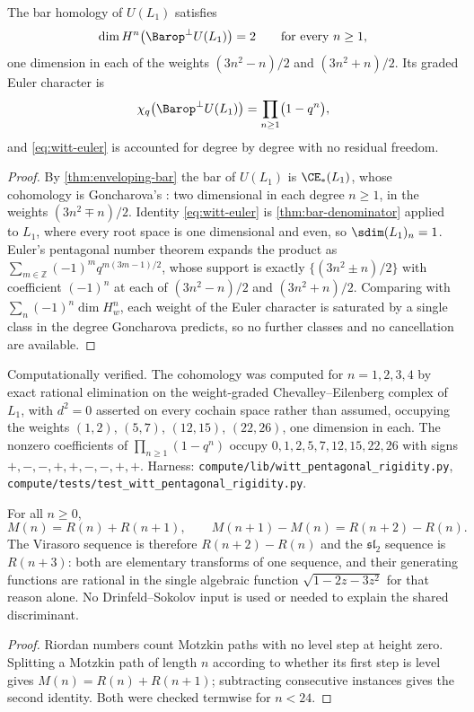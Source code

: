 \begin{theorem}\label{thm:pentagonal}
The bar homology of \(U(L_1)\) satisfies
\[
 \dim H^n\bigl(\Barop^{\perp}U(L_1)\bigr)=2
 \qquad\text{for every }n\ge1,
\]
one dimension in each of the weights \((3n^2-n)/2\) and \((3n^2+n)/2\).  Its
graded Euler character is
\begin{equation}\label{eq:witt-euler}
 \chi_q\bigl(\Barop^{\perp}U(L_1)\bigr)=\prod_{n\ge1}\bigl(1-q^n\bigr),
\end{equation}
and \eqref{eq:witt-euler} is accounted for degree by degree with no residual
freedom.
\end{theorem}
\begin{proof}
By \cref{thm:enveloping-bar} the bar of \(U(L_1)\) is \(\CE_*(L_1)\), whose
cohomology is Goncharova's \cite{Goncharova1973}: two dimensional in each degree
\(n\ge1\), in the weights \((3n^2\mp n)/2\).  Identity \eqref{eq:witt-euler} is
\cref{thm:bar-denominator} applied to \(L_1\), where every root space is one
dimensional and even, so \(\sdim(L_1)_n=1\).  Euler's pentagonal number theorem
expands the product as \(\sum_{m\in\mathbb Z}(-1)^mq^{m(3m-1)/2}\), whose support
is exactly \(\{(3n^2\pm n)/2\}\) with coefficient \((-1)^n\) at each of
\((3n^2-n)/2\) and \((3n^2+n)/2\).  Comparing with \(\sum_n(-1)^n\dim H^n_w\),
each weight of the Euler character is saturated by a single class in the degree
Goncharova predicts, so no further classes and no cancellation are available.
\end{proof}

\begin{statusbox}
Computationally verified.  The cohomology was computed for \(n=1,2,3,4\) by exact
rational elimination on the weight-graded Chevalley--Eilenberg complex of
\(L_1\), with \(d^2=0\) asserted on every cochain space rather than assumed,
occupying the weights \((1,2)\), \((5,7)\), \((12,15)\), \((22,26)\), one
dimension in each.  The nonzero coefficients of \(\prod_{n\ge1}(1-q^n)\) occupy
\(0,1,2,5,7,12,15,22,26\) with signs \(+,-,-,+,+,-,-,+,+\).  Harness:
\texttt{compute/lib/witt\_pentagonal\_rigidity.py},
\texttt{compute/tests/test\_witt\_pentagonal\_rigidity.py}.
\end{statusbox}

\begin{proposition}\label{prop:one-sequence}
For all \(n\ge0\),
\[
 M(n)=R(n)+R(n+1),
 \qquad
 M(n+1)-M(n)=R(n+2)-R(n).
\]
The Virasoro sequence is therefore \(R(n+2)-R(n)\) and the \(\mathfrak{sl}_2\)
sequence is \(R(n+3)\): both are elementary transforms of one sequence, and their
generating functions are rational in the single algebraic function
\(\sqrt{1-2z-3z^2}\) for that reason alone.  No Drinfeld--Sokolov input is used
or needed to explain the shared discriminant.
\end{proposition}
\begin{proof}
Riordan numbers count Motzkin paths with no level step at height zero.  Splitting
a Motzkin path of length \(n\) according to whether its first step is level gives
\(M(n)=R(n)+R(n+1)\); subtracting consecutive instances gives the second
identity.  Both were checked termwise for \(n<24\).
\end{proof}

